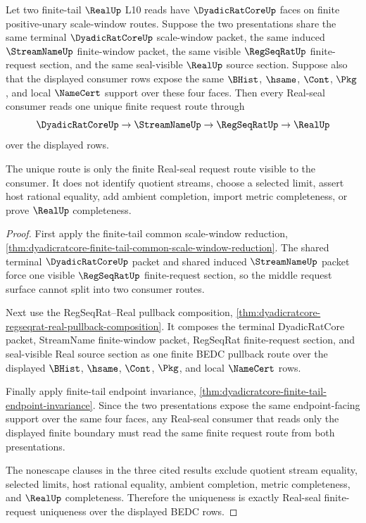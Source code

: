 \begin{theorem}
\label{thm:dyadicratcore-finite-request-real-seal-uniqueness}
Let two finite-tail $\RealUp$ L10 reads have $\DyadicRatCoreUp$ faces on finite positive-unary scale-window routes. Suppose the two presentations share the same terminal $\DyadicRatCoreUp$ scale-window packet, the same induced $\StreamNameUp$ finite-window packet, the same visible $\RegSeqRatUp$ finite-request section, and the same seal-visible $\RealUp$ source section. Suppose also that the displayed consumer rows expose the same $\BHist$, $\hsame$, $\Cont$, $\Pkg$, and local $\NameCert$ support over these four faces. Then every Real-seal consumer reads one unique finite request route through
$$
\DyadicRatCoreUp \to \StreamNameUp \to \RegSeqRatUp \to \RealUp
$$
over the displayed rows.

The unique route is only the finite Real-seal request route visible to the consumer. It does not identify quotient streams, choose a selected limit, assert host rational equality, add ambient completion, import metric completeness, or prove $\RealUp$ completeness.
\end{theorem}
\begin{proof}
First apply the finite-tail common scale-window reduction, \autoref{thm:dyadicratcore-finite-tail-common-scale-window-reduction}. The shared terminal $\DyadicRatCoreUp$ packet and shared induced $\StreamNameUp$ packet force one visible $\RegSeqRatUp$ finite-request section, so the middle request surface cannot split into two consumer routes.

Next use the RegSeqRat--Real pullback composition, \autoref{thm:dyadicratcore-regseqrat-real-pullback-composition}. It composes the terminal DyadicRatCore packet, StreamName finite-window packet, RegSeqRat finite-request section, and seal-visible Real source section as one finite BEDC pullback route over the displayed $\BHist$, $\hsame$, $\Cont$, $\Pkg$, and local $\NameCert$ rows.

Finally apply finite-tail endpoint invariance, \autoref{thm:dyadicratcore-finite-tail-endpoint-invariance}. Since the two presentations expose the same endpoint-facing support over the same four faces, any Real-seal consumer that reads only the displayed finite boundary must read the same finite request route from both presentations.

The nonescape clauses in the three cited results exclude quotient stream equality, selected limits, host rational equality, ambient completion, metric completeness, and $\RealUp$ completeness. Therefore the uniqueness is exactly Real-seal finite-request uniqueness over the displayed BEDC rows.
\end{proof}

